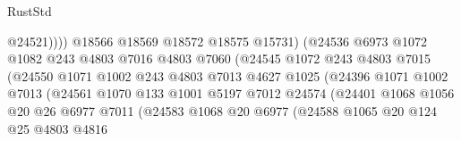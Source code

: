 \begin{lexlean}{RustStd}
\begin{coremodule}
                                          @24521))))
                                  @18566
                                  @18569
                                  @18572
                                  @18575
                                  @15731)
                                (@24536
                                  @6973
                                  @1072
                                  @1082
                                  @243
                                  @4803
                                  @7016
                                  @4803
                                  @7060
                                  (@24545
                                    @1072
                                    @243
                                    @4803
                                    @7015
                                    (@24550
                                      @1071
                                      @1002
                                      @243
                                      @4803
                                      @7013
                                      @4627
                                      @1025
                                      (@24396
                                        @1071
                                        @1002
                                        @7013
                                        (@24561
                                          @1070
                                          @133
                                          @1001
                                          @5197
                                          @7012
                                          @24574
                                          (@24401
                                            @1068
                                            @1056
                                            @20
                                            @26
                                            @6977
                                            @7011
                                            (@24583
                                              @1068
                                              @20
                                              @6977
                                              (@24588
                                                @1065
                                                @20
                                                @124
                                                @25
                                                @4803
                                                @4816

\end{coremodule}
\end{lexlean}
